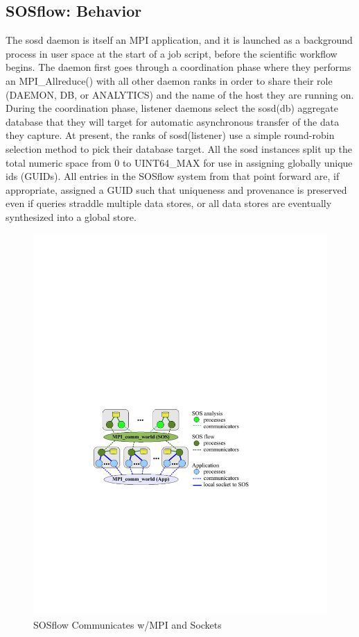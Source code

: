 \subsection{SOSflow: Behavior}
The sosd daemon is itself an MPI application, and it is launched as a
background process in user space at the start of a job script, before
the scientific workflow begins.  The daemon first goes through a
coordination phase where they performs an MPI\_Allreduce() with all
other daemon ranks in order to share their role (DAEMON, DB, or
ANALYTICS) and the name of the host they are running on. During the
coordination phase, listener daemons select the sosd(db) aggregate
database that they will target for automatic asynchronous transfer of
the data they capture. At present, the ranks of sosd(listener) use a
simple round-robin selection method to pick their database target. All
the sosd instances split up the total numeric space from 0 to
UINT64\_MAX for use in assigning globally unique ids (GUIDs). All
entries in the SOSflow system from that point forward are, if
appropriate, assigned a GUID such that uniqueness and provenance is
preserved even if queries straddle multiple data stores, or all data
stores are eventually synthesized into a global store.

\begin{figure}[!t]
  \centering
  \includegraphics[width=5in]{images/sos-mpmd.pdf}
  \caption{SOSflow Communicates w/MPI and Sockets}
  \label{fig_sim}
\end{figure}



